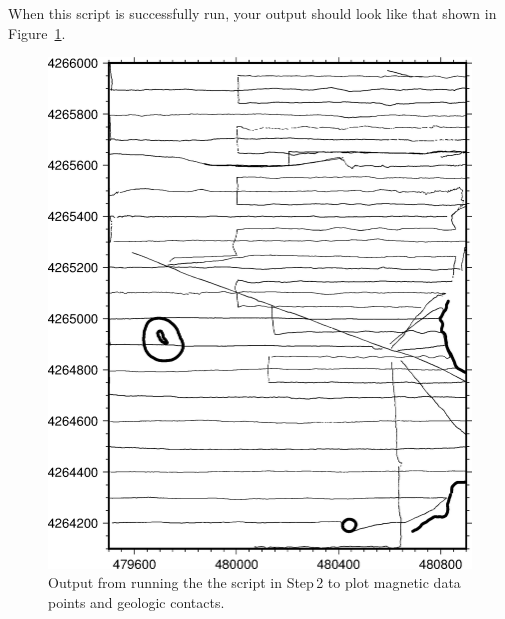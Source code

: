 \documentclass[letterpaper,10pt]{report}
\begin{document}
When this script is successfully run, your output should look like that shown in Figure~\ref{fig:points}.



\begin{figure}
    \centering
    \includegraphics[scale=0.75]{./images/san_raf_points_map.png}
    \caption{
Output from running the the script in Step\,2 to plot magnetic data points and geologic contacts.}
    \label{fig:points}
\end{figure}
\end{document}
